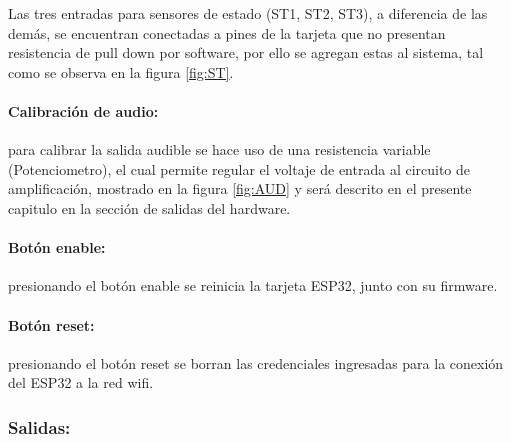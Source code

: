 		Las tres entradas para sensores de estado (ST1, ST2, ST3), a diferencia de las demás, se encuentran conectadas a pines de la tarjeta que no presentan resistencia de pull down por software, por ello se agregan estas al sistema, tal como se observa en la figura \ref{fig:ST}.\\
		
%	
%	
	
	\paragraph{Calibración de audio:}
		para calibrar la salida audible se hace uso de una resistencia variable (Potenciometro), el cual permite regular el voltaje de entrada al circuito de amplificación, mostrado en la figura \ref{fig:AUD} y será descrito en el presente capitulo en la sección de salidas del hardware.\\
		
	\paragraph{Botón enable:}
		presionando el botón enable se reinicia la tarjeta ESP32, junto con su firmware.\\
		
	\paragraph{Botón reset:}
		presionando el botón reset se borran las credenciales ingresadas para la conexión del ESP32 a la red wifi.\\
		
	\subsubsection{Salidas:}

